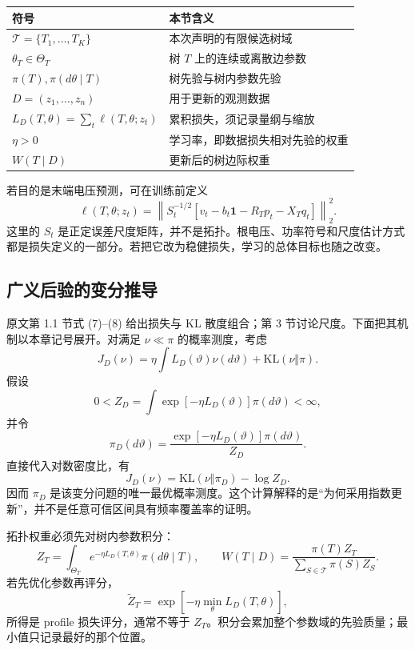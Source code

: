 \begin{center}
\begin{tabularx}{\linewidth}{lX}
\toprule
符号 & 本节含义\\
\midrule
$\mathcal T=\{T_1,\ldots,T_K\}$ & 本次声明的有限候选树域\\
$\theta_T\in\Theta_T$ & 树 $T$ 上的连续或离散边参数\\
$\pi(T),\pi(d\theta\mid T)$ & 树先验与树内参数先验\\
$D=(z_1,\ldots,z_n)$ & 用于更新的观测数据\\
$L_D(T,\theta)=\sum_t\ell(T,\theta;z_t)$ & 累积损失，须记录量纲与缩放\\
$\eta>0$ & 学习率，即数据损失相对先验的权重\\
$W(T\mid D)$ & 更新后的树边际权重\\
\bottomrule
\end{tabularx}
\end{center}

若目的是末端电压预测，可在训练前定义
\[
 \ell(T,\theta;z_t)=
 \left\|S_t^{-1/2}
 [v_t-b_t\mathbf1-R_Tp_t-X_Tq_t]\right\|_2^2.
\]
这里的 $S_t$ 是正定误差尺度矩阵，并不是拓扑。根电压、功率符号和尺度估计方式都是损失定义的一部分。若把它改为稳健损失，学习的总体目标也随之改变。

\subsection{广义后验的变分推导}

原文第 1.1 节式 (7)--(8) 给出损失与 KL 散度组合；第 3 节讨论尺度。下面把其机制以本章记号展开。对满足 $\nu\ll\pi$ 的概率测度，考虑
\[
 J_D(\nu)=\eta\int L_D(\vartheta)\nu(d\vartheta)
               +\mathrm{KL}(\nu\Vert\pi).
\]
假设
\[
 0<Z_D=\int \exp[-\eta L_D(\vartheta)]\pi(d\vartheta)<\infty,
\]
并令
\[
 \pi_D(d\vartheta)=
 \frac{\exp[-\eta L_D(\vartheta)]\pi(d\vartheta)}{Z_D}.
\]
直接代入对数密度比，有
\[
 J_D(\nu)=\mathrm{KL}(\nu\Vert\pi_D)-\log Z_D.
\]
因而 $\pi_D$ 是该变分问题的唯一最优概率测度。这个计算解释的是“为何采用指数更新”，并不是任意可信区间具有频率覆盖率的证明。

拓扑权重必须先对树内参数积分：
\begin{equation}
 Z_T=\int_{\Theta_T}e^{-\eta L_D(T,\theta)}\pi(d\theta\mid T),
 \qquad
 W(T\mid D)=\frac{\pi(T)Z_T}{\sum_{S\in\mathcal T}\pi(S)Z_S}.
 \label{eq:textbook-S14-integral}
\end{equation}
若先优化参数再评分，
\[
 \widetilde Z_T=\exp[-\eta\min_{\theta}L_D(T,\theta)],
\]
所得是 profile 损失评分，通常不等于 $Z_T$。积分会累加整个参数域的先验质量；最小值只记录最好的那个位置。

